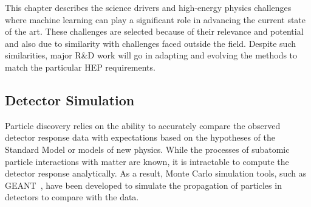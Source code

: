 

This chapter describes the science drivers and high-energy physics challenges where machine learning can play a significant role in advancing the current state of the art.
These challenges are selected because of their relevance and potential and also due to similarity with challenges faced outside the field.
Despite such similarities, major R\&D work will go in adapting and evolving the methods to match the particular HEP requirements.


\subsection{Detector Simulation}
\label{sec:fast-simulation}

Particle discovery relies on the ability to accurately compare the observed detector response data with expectations based on the hypotheses of the Standard Model or models of new physics.
While the processes of subatomic particle interactions with matter are known, it is intractable to compute the detector response analytically. As a result, Monte Carlo simulation tools, such as GEANT~\cite{GEANT4}, have been developed to simulate the propagation of particles in detectors to compare with the data.\\



